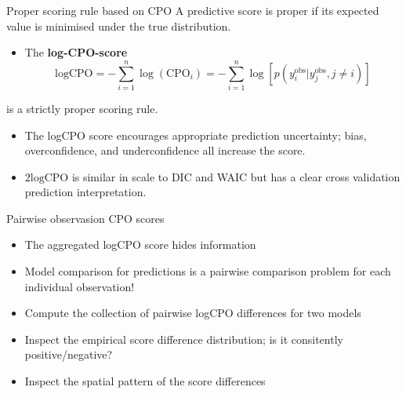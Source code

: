 \documentclass[
  ignorenonframetext,
]{beamer}
\providecommand{\tightlist}{%
  \setlength{\itemsep}{0pt}\setlength{\parskip}{0pt}}
\begin{document}
\begin{frame}{Proper scoring rule based on CPO}
\protect\hypertarget{proper-scoring-rule-based-on-cpo}{}
A predictive score is proper if its expected value is minimised under
the true distribution.

\begin{itemize}
\tightlist
\item
  The \textbf{log-CPO-score} \[
  \text{logCPO} = -\sum_{i = 1}^n\log(\text{CPO}_i)  = -\sum_{i = 1}^n\log[p(y_i^{\text{obs}}|y_j^\text{obs}, j\neq i)]
  \]
\end{itemize}

is a strictly proper scoring rule.

\begin{itemize}
\item
  The logCPO score encourages appropriate prediction uncertainty; bias,
  overconfidence, and underconfidence all increase the score.
\item
  \(2\text{logCPO}\) is similar in scale to DIC and WAIC but has a clear
  cross validation prediction interpretation.
\end{itemize}
\end{frame}

\begin{frame}{Pairwise observasion CPO scores}
\protect\hypertarget{pairwise-observasion-cpo-scores}{}
\begin{itemize}
\item
  The aggregated logCPO score hides information
\item
  Model comparison for predictions is a pairwise comparison problem for
  each individual observation!
\item
  Compute the collection of pairwise logCPO differences for two models
\item
  Inspect the empirical score difference distribution; is it consitently
  positive/negative?
\item
  Inspect the spatial pattern of the score differences
\end{itemize}
\end{frame}
\end{document}
